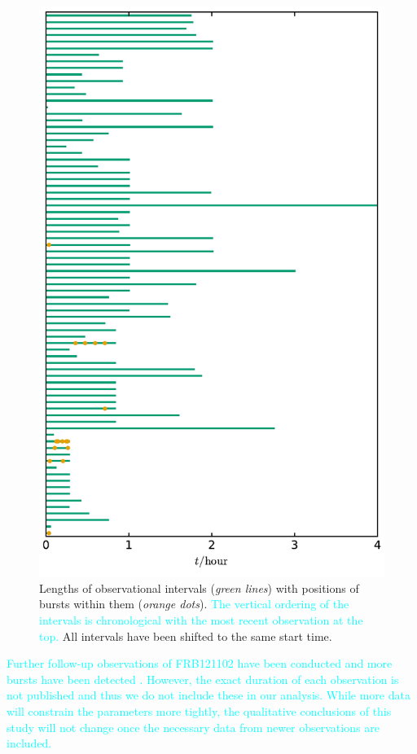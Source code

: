 \documentclass[fleqn,usenatbib]{mnras}
\newcommand{\new}[1]{\textcolor{cyan}{#1}}
\begin{document}
\begin{figure}
	\includegraphics[width=\columnwidth]{intervals.pdf}
	\caption{\label{fig:intervals}Lengths of observational intervals (\emph{green lines}) with positions of bursts within them (\emph{orange dots}). \new{The vertical ordering of the intervals is chronological with the most recent observation at the top.} All intervals have been shifted to the same start time.}
\end{figure}

\new{Further follow-up observations of FRB121102 have been conducted and more bursts have been detected \citep[e.g.,][]{chatterjee-2017}. However, the exact duration of each observation is not published and thus we do not include these in our analysis. While more data will constrain the parameters more tightly, the qualitative conclusions of this study will not change once the necessary data from newer observations are included.}
\end{document}
